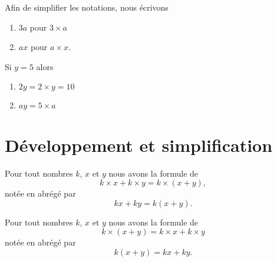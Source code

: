 \begin{Aretenir}
    Afin de simplifier les notations, nous écrivons
    \begin{enumerate}
        \item
            \( 3a\) pour \( 3\times a\)
        \item
            \( ax\) pour \( a\times x\).
    \end{enumerate}
\end{Aretenir}

\begin{example}
    Si \( y=5\) alors
    \begin{enumerate}
        \item
            \( 2y=2\times y=10\)
        \item
            \( ay=5\times a\)
    \end{enumerate}
\end{example}

\section{Développement et simplification}



\begin{Aretenir}
    Pour tout nombres \( k\), \( x\) et \( y\) nous avons la formule de 
    \begin{equation}
        k\times x+k\times y=k\times (x+y),
    \end{equation}
    notée en abrégé par
    \begin{equation}
        kx+ky=k(x+y).
    \end{equation}
\end{Aretenir}

\begin{Aretenir}
    Pour tout nombres \( k\), \( x\) et \( y\) nous avons la formule de 
    \begin{equation}
        k\times (x+y)=k\times x+k\times y
    \end{equation}
    notée en abrégé par
    \begin{equation}
        k(x+y)=kx+ky.
    \end{equation}
\end{Aretenir}

